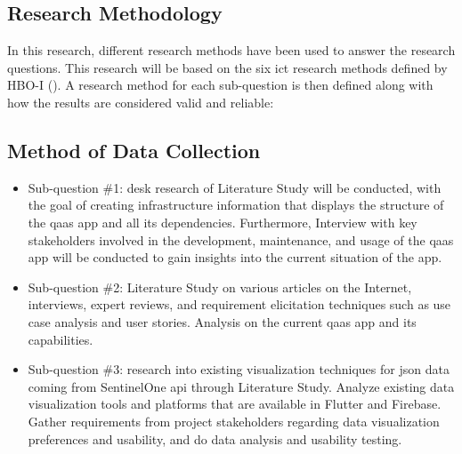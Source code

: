 \begin{multicols}{2}
      \section{Research Methodology}
      In this research, different research methods have been used to answer the research questions. This research
      will be based on the six \acrshort{ict} research methods defined by HBO-I (\cite{ictresearchmethods}). A
      research method for each sub-question is then defined along with how the results are considered valid and
      reliable:
      \subsection{Method of Data Collection}
      \begin{itemize}[label=-]
            \item Sub-question \#1: desk research of Literature Study will be conducted, with the goal of creating
                  infrastructure information that displays the structure of the \acrshort{qaas} app and all its
                  dependencies. Furthermore, Interview with key stakeholders involved in the  development, maintenance,
                  and usage of the \acrshort{qaas} app will be conducted to gain insights into the current situation
                  of the app.
            \item Sub-question \#2: Literature Study on various articles on the Internet, interviews, expert reviews,
                  and requirement elicitation techniques such as use case analysis and user stories. Analysis on the
                  current \acrshort{qaas} app and its capabilities.
            \item Sub-question \#3: research into existing visualization techniques for \acrshort{json} data coming from
                  SentinelOne \acrshort{api} through Literature Study. Analyze existing data visualization tools and
                  platforms that are available in Flutter and Firebase. Gather requirements from project stakeholders
                  regarding data visualization preferences and usability, and do data analysis and usability testing.

\end{itemize}
\end{multicols}
